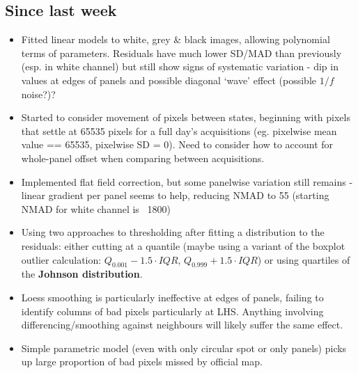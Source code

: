 \documentclass[10pt,fleqn]{article}
\begin{document}
\subsection*{Since last week}

\begin{itemize}

\item Fitted linear models to white, grey \& black images, allowing polynomial terms of parameters. Residuals have much lower SD/MAD than previously (esp. in white channel) but still show signs of systematic variation - dip in values at edges of panels and possible diagonal `wave' effect (possible $1/f$ noise?)?
 
\item Started to consider movement of pixels between states, beginning with pixels that settle at 65535 pixels for a full day's acquisitions (eg. pixelwise mean value == 65535, pixelwise SD = 0). Need to consider how to account for whole-panel offset when comparing between acquisitions.

\item Implemented flat field correction, but some panelwise variation still remains - linear gradient per panel seems to help, reducing NMAD to 55 (starting NMAD for white channel is ~1800)

\item Using two approaches to thresholding after fitting a distribution to the residuals: either cutting at a quantile (maybe using a variant of the boxplot outlier calculation: $Q_{0.001} - 1.5 \cdot IQR$, $Q_{0.999} + 1.5 \cdot IQR$) or using quartiles of the \textbf{Johnson distribution}.

\item Loess smoothing is particularly ineffective at edges of panels, failing to identify columns of bad pixels particularly at LHS. Anything involving differencing/smoothing against neighbours will likely suffer the same effect.

\item Simple parametric model (even with only circular spot or only panels) picks up large proportion of bad pixels missed by official map.

\end{itemize}
\end{document}
